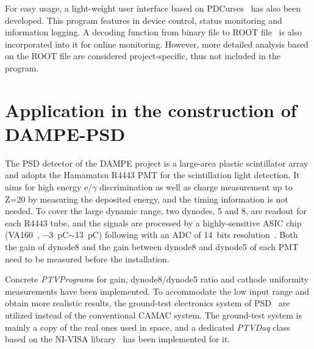 \documentclass{nst}
\begin{document}
For easy usage, a light-weight user interface based on PDCurses~\cite{pdcurses} has also been developed.
This program features in device control, status monitoring and information logging.
A decoding function from binary file to ROOT file~\cite{root} is also incorporated into it for online monitoring.
However, more detailed analysis based on the ROOT file are considered project-specific, thus not included in the program. 

\section{Application in the construction of DAMPE-PSD}
\label{sec:application}

The PSD detector of the DAMPE project is a large-area plastic scintillator array and adopts the Hamamatsu R4443 PMT for the scintillation light detection.
It aims for high energy e/$\gamma$ discrimination as well as charge measurement up to Z=20 by measuring the deposited energy, and the timing information is not needed.
To cover the large dynamic range, two dynodes, 5 and 8, are readout for each R4443 tube, 
and the signals are processed by a highly-sensitive ASIC chip (VA160~\cite{va160}, \SI{-3}{\pico\coulomb}$\sim$\SI{13}{\pico\coulomb}) following with an ADC of 14~bits resolution~\cite{yanghaibo_fee}. 
Both the gain of dynode8 and the gain between dynode8 and dynode5 of each PMT need to be  measured before the installation.

Concrete \textit{PTVProgram}s for gain, dynode8/dynode5 ratio and cathode uniformity measurements have been implemented.
To accommodate the low input range and obtain more realistic results, the ground-test electronics system of PSD~\cite{yanghaibo_fee} are utilized instead of the conventional CAMAC system. 
The ground-test system is mainly a copy of the real ones used in space, and a dedicated \textit{PTVDaq} class based on the NI-VISA library~\cite{ni_visa} has been implemented for it.

\end{document}
